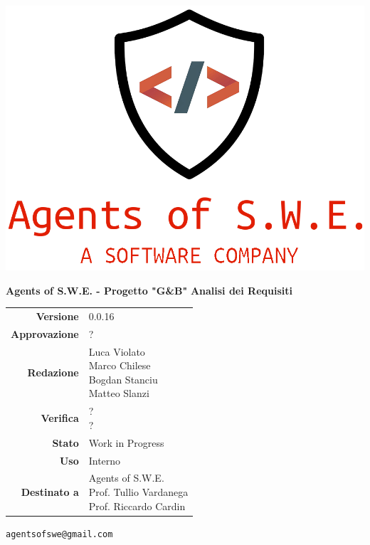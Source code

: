 


\begin{titlepage}
\thispagestyle{empty}

\begin{center}

\includegraphics[scale=0.3]{./images/logo.png} 

\large \textbf{Agents of S.W.E. - Progetto "G\&B"}
\vfill
\Huge \textbf{Analisi dei Requisiti}
\vfill
\large
\renewcommand{\arraystretch}{1.3}
\begin{tabular}{r|l}
\textbf{Versione} & 0.0.16\\
\textbf{Approvazione} & ?\\
\textbf{Redazione} & \parbox[t]{5cm}{Luca Violato\\Marco Chilese\\Bogdan Stanciu\\Matteo Slanzi}\\
\textbf{Verifica} & \parbox[t]{5cm}{?\\?}\\
\textbf{Stato} & Work in Progress\\
\textbf{Uso} & Interno\\
\textbf{Destinato a} & \parbox[t]{5cm}{Agents of S.W.E. \\Prof. Tullio Vardanega\\Prof. Riccardo Cardin}
\end{tabular}
\vfill
\small
\texttt{agentsofswe@gmail.com}
\end{center}
\end{titlepage}

